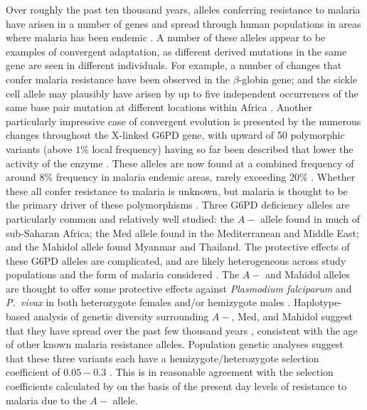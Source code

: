 \documentclass{article}
\begin{document}
Over roughly the past ten thousand years, alleles conferring resistance to malaria have arisen in a number of genes 
and spread through human populations in areas where malaria has been endemic \citep{Kwiatkowski:05}. 
A number of these alleles appear to be examples of convergent adaptation, 
as different derived mutations in the same gene are seen in different individuals.
For example, 
a number of changes that confer malaria resistance have been observed in the $\beta$-globin gene;
and the sickle cell allele may plausibly have arisen by up to five independent occurrences
of the same base pair mutation at different locations within Africa
\citep{Flint:98,ralphcoop2010}.
Another particularly impressive case of convergent evolution is presented by the numerous changes throughout the X-linked G6PD gene, 
with upward of 50 polymorphic variants (above $1\%$ local frequency) having so far been described 
that lower the activity of the enzyme \citep{Howes-g6pd-variants,Minucci-g6pd}. 
These alleles are now found at a combined frequency of around 8\% frequency in malaria endemic areas,
rarely exceeding 20\% \citep{Howes-g6pd-preval}. 
Whether these all confer resistance to malaria is unknown,
but malaria is thought to be the primary driver of these polymorphisms
\citep[see][ for a general review]{hedrick2011population}.
Three G6PD deficiency alleles are particularly common and relatively well studied: 
the $A-$ allele found in much of sub-Saharan Africa; 
the Med allele found in the Mediterranean and Middle East; 
and the Mahidol allele found Myanmar and Thailand.
The protective effects of these G6PD alleles are complicated, and are likely heterogeneous
across study populations and the form of malaria considered
\citep[see ][ for recent discussion]{manjurano_2015, malaria_network_2014}.  
The $A-$ and Mahidol alleles are thought to offer some protective effects against {\it Plasmodium falciparum} and {\it P.\ vivax} in both
heterozygote females and/or hemizygote males \citep{Ruwende-g6pd,
  Louicharoen-g6pd, manjurano_2015}. 
Haplotype-based analysis of genetic diversity surrounding
$A-$, Med, and Mahidol suggest that they have spread over the past 
few thousand years \citep{tishkoff-g6pd,Slatkin-age-est,Saunders-g6pd,Louicharoen-g6pd}, 
consistent with the age of other known malaria resistance alleles. 
Population genetic analyses suggest that these three variants each have a hemizygote/heterozygote 
selection coefficient of $0.05-0.3$
\citep{tishkoff-g6pd,Slatkin-age-est,Saunders-g6pd,Louicharoen-g6pd}. 
This is in reasonable agreement with the selection coefficients calculated by
\citet{Ruwende-g6pd} on the basis of the present day levels of
resistance to malaria due to the $A-$ allele. \\
\end{document}
